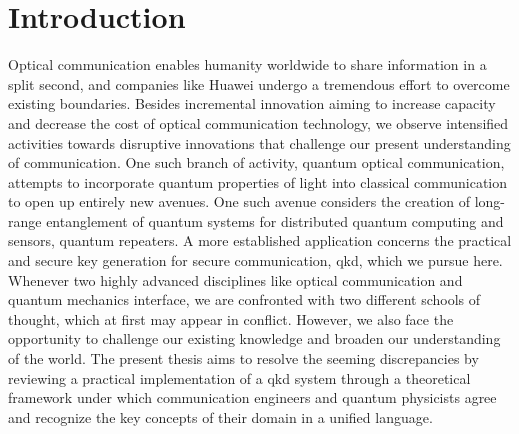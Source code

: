 \chapter*{Introduction}

Optical communication enables humanity worldwide to share information in a split second, and companies like Huawei undergo a tremendous effort to overcome existing boundaries.
Besides incremental innovation aiming to increase capacity and decrease the cost of optical communication technology, we observe intensified activities towards disruptive innovations that challenge our present understanding of communication.
One such branch of activity, quantum optical communication, attempts to incorporate quantum properties of light into classical communication to open up entirely new avenues.
One such avenue considers the creation of long-range entanglement of quantum systems for distributed quantum computing and sensors, quantum repeaters.
A more established application concerns the practical and secure key generation for secure communication, \gls{qkd}, which we pursue here.
Whenever two highly advanced disciplines like optical communication and quantum mechanics interface, we are confronted with two different schools of thought, which at first may appear in conflict.
However, we also face the opportunity to challenge our existing knowledge and broaden our understanding of the world.
The present thesis aims to resolve the seeming discrepancies by reviewing a practical implementation of a \gls{qkd} system through a theoretical framework under which communication engineers and quantum physicists agree and recognize the key concepts of their domain in a unified language.


